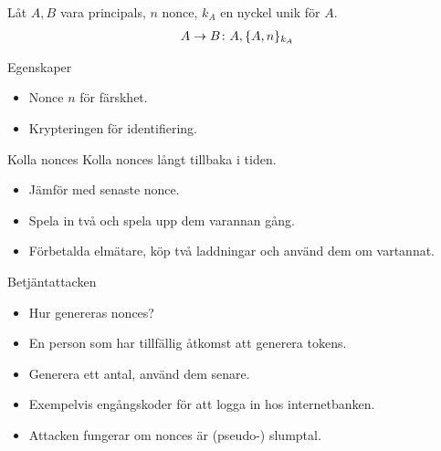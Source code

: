 \begin{frame}
  \begin{example}
    Låt \(A, B\) vara principals, \(n\) nonce, \(k_A\) en nyckel unik för 
    \(A\).
    \begin{align*}
      A\to B\colon A, \{A, n\}_{k_A}
    \end{align*}
  \end{example}
  \begin{block}{Egenskaper}
    \begin{itemize}
      \item Nonce \(n\) för färskhet.
      \item Krypteringen för identifiering.
    \end{itemize}
  \end{block}
\end{frame}

\begin{frame}{Kolla nonces}
  Kolla nonces långt tillbaka i tiden.
  \begin{itemize}
    \item Jämför med senaste nonce.
    \item Spela in två och spela upp dem varannan gång.
    \item Förbetalda elmätare, köp två laddningar och använd dem om vartannat.
  \end{itemize}
\end{frame}

\begin{frame}{Betjäntattacken}
  \begin{itemize}
    \item Hur genereras nonces?
    \item En person som har tillfällig åtkomst att generera tokens.
    \item Generera ett antal, använd dem senare.
    \item Exempelvis engångskoder för att logga in hos internetbanken.
    \item Attacken fungerar om nonces är (pseudo-) slumptal.
  \end{itemize}
\end{frame}

